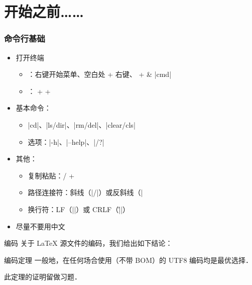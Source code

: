 \section{开始之前……}

\begin{frame}[fragile]
\frametitle{命令行基础}
\begin{itemize}
  \item 打开终端
    \begin{itemize}
      \item \faWindows{}：右键开始菜单、空白处 \kbdShift{} + 右键、\kbdWin{} +  \& |cmd|
      \item \faLinux{}：\kbdCtrl{} + \kbdAlt{} + 
    \end{itemize}
  \item 基本命令：
    \begin{itemize}
      \item |cd|、|ls/dir|、|rm/del|、|clear/cls|
      \item 选项：|-h|、|--help|、|/?|
    \end{itemize}
  \item 其他：
    \begin{itemize}
      \item 复制粘贴：\kbdCtrl{}/\kbdShift{} + \kbdIns{}
      \item 路径连接符：斜线（|/|）或反斜线（|\|）
      \item 换行符：LF（|\n|）或 CRLF（|\r\n|）
    \end{itemize}
  \item \alert{尽量不要用中文}
\end{itemize}
\end{frame}

\begin{frame}{编码}
关于 \LaTeX{} 源文件的编码，我们给出如下结论：
\begin{alertblock}{编码定理}
  一般地，在任何场合使用（不带 BOM）的 \alert{UTF\CASE{-}8} 编码均是最优选择．
\end{alertblock}
此定理的证明留做习题．
\end{frame}
